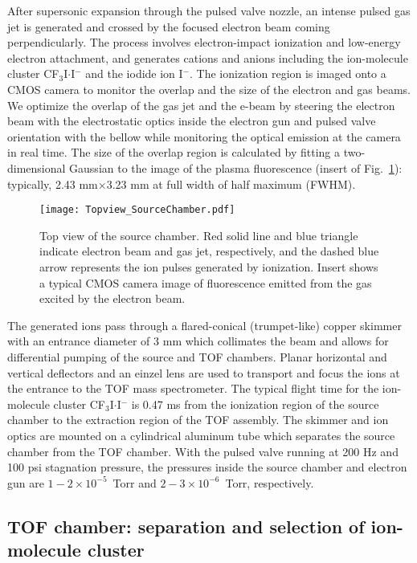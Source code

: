 \documentclass[%
aip,
rsi,
 amsmath,amssymb,
reprint,%
]{revtex4-1}
\begin{document}
After supersonic expansion through the pulsed valve nozzle, an intense pulsed gas jet is generated and crossed by the focused electron beam coming perpendicularly. The process involves electron-impact ionization\cite{mark_fundamental_1982} and low-energy electron attachment\cite{Illenberger1994}, and generates cations and anions including the ion-molecule cluster CF$_3$I$\cdot$I$^-$ and the iodide ion I$^-$. The ionization region is imaged onto a CMOS camera to monitor the overlap and the size of the electron and gas beams. We optimize the overlap of the gas jet and the e-beam by steering the electron beam with the electrostatic optics inside the electron gun and pulsed valve orientation with the bellow while monitoring the optical emission at the camera in real time. The size of the overlap region is calculated by fitting a two-dimensional Gaussian to the image of the plasma fluorescence (insert of Fig.~\ref{source}): typically, 2.43 mm$\times$3.23 mm at full width of half maximum (FWHM). 

\begin{figure}
\centering
\texttt{[image: Topview\_SourceChamber.pdf]}%
\caption{Top view of the source chamber. Red solid line and blue triangle indicate electron beam and gas jet, respectively, and the dashed blue arrow represents the ion pulses generated by ionization. Insert shows a typical CMOS camera image of fluorescence emitted from the gas excited by the electron beam.}
\label{source}
\end{figure}

The generated ions pass through a flared-conical (trumpet-like) copper skimmer with an entrance diameter of 3 mm which collimates the beam and allows for differential pumping of the source and TOF chambers. Planar horizontal and vertical  deflectors and an einzel lens are used to transport and focus the ions at the entrance to the TOF mass spectrometer. The typical flight time for the ion-molecule cluster CF$_3$I$\cdot$I$^-$ is 0.47 ms from the ionization region of the source chamber to the extraction region of the TOF assembly. The skimmer and ion optics are mounted on a cylindrical aluminum  tube which separates the source chamber from the TOF chamber. With the pulsed valve running at 200 Hz and 100 psi stagnation pressure, the pressures inside the source chamber and electron gun are $1-2\times10^{-5}$~Torr and $2-3\times10^{-6}$~Torr, respectively. 

\subsection{TOF chamber: separation and selection of ion-molecule cluster} 
\end{document}
